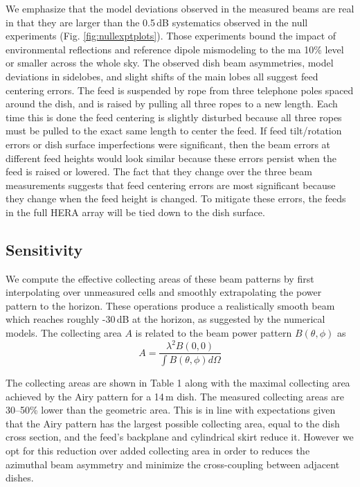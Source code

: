 \documentclass{emulateapj}
\begin{document}
We emphasize that the model deviations observed in the measured beams are real in that they are larger than the 0.5\,dB systematics observed in the null experiments (Fig. \ref{fig:nullexptplots}). Those experiments bound the impact of environmental reflections and reference dipole mismodeling to the ma 10\% level or smaller across the whole sky. The observed dish beam asymmetries, model deviations in sidelobes, and slight shifts of the main lobes all suggest feed centering errors. The feed is suspended by rope from three telephone poles spaced around the dish, and is raised by pulling all three ropes to a new length. Each time this is done the feed centering is slightly disturbed because all three ropes must be pulled to the exact same length to center the feed. If feed tilt/rotation errors or dish surface imperfections were significant, then the beam errors at different feed heights would look similar because these errors persist when the feed is raised or lowered. The fact that they change over the three beam measurements suggests that feed centering errors are most significant because they change when the feed height is changed. To mitigate these errors, the feeds in the full HERA array will be tied down to the dish surface.

\subsection{Sensitivity}

We compute the effective collecting areas of these beam patterns by first interpolating over unmeasured cells and smoothly extrapolating the power pattern to the horizon. These operations produce a realistically smooth beam which reaches roughly -30\,dB at the horizon, as suggested by the numerical models. The collecting area $A$ is related to the beam power pattern $B(\theta,\phi)$ as
\begin{equation}
	A=\frac{\lambda^2 B(0,0)}{\int B(\theta,\phi)d\Omega}
\end{equation}

The collecting areas are shown in Table 1 along with the maximal collecting area achieved by the Airy pattern for a 14\,m dish. The measured collecting areas are 30--50\% lower than the geometric area. This is in line with expectations given that the Airy pattern has the largest possible collecting area, equal to the dish cross section, and the feed's backplane and cylindrical skirt reduce it. However we opt for this reduction over added collecting area in order to reduces the azimuthal beam asymmetry and minimize the cross-coupling between adjacent dishes.
\end{document}
